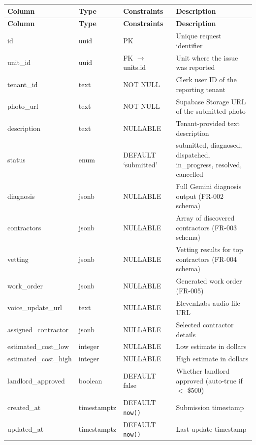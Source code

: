 \documentclass[12pt,a4paper]{article}
\begin{document}
\begin{longtable}{L{3cm} L{2cm} L{3cm} L{5cm}}
\toprule
\textbf{Column} & \textbf{Type} & \textbf{Constraints} & \textbf{Description} \\
\midrule
\endfirsthead
\toprule
\textbf{Column} & \textbf{Type} & \textbf{Constraints} & \textbf{Description} \\
\midrule
\endhead
\bottomrule
\endfoot
id & uuid & PK & Unique request identifier \\
\midrule
unit\_id & uuid & FK $\rightarrow$ units.id & Unit where the issue was reported \\
\midrule
tenant\_id & text & NOT NULL & Clerk user ID of the reporting tenant \\
\midrule
photo\_url & text & NOT NULL & Supabase Storage URL of the submitted photo \\
\midrule
description & text & NULLABLE & Tenant-provided text description \\
\midrule
status & enum & DEFAULT `submitted' & submitted, diagnosed, dispatched, in\_progress, resolved, cancelled \\
\midrule
diagnosis & jsonb & NULLABLE & Full Gemini diagnosis output (FR-002 schema) \\
\midrule
contractors & jsonb & NULLABLE & Array of discovered contractors (FR-003 schema) \\
\midrule
vetting & jsonb & NULLABLE & Vetting results for top contractors (FR-004 schema) \\
\midrule
work\_order & jsonb & NULLABLE & Generated work order (FR-005) \\
\midrule
voice\_update\_url & text & NULLABLE & ElevenLabs audio file URL \\
\midrule
assigned\_contractor & jsonb & NULLABLE & Selected contractor details \\
\midrule
estimated\_cost\_low & integer & NULLABLE & Low estimate in dollars \\
\midrule
estimated\_cost\_high & integer & NULLABLE & High estimate in dollars \\
\midrule
landlord\_approved & boolean & DEFAULT false & Whether landlord approved (auto-true if $<$ \$500) \\
\midrule
created\_at & timestamptz & DEFAULT \texttt{now()} & Submission timestamp \\
\midrule
updated\_at & timestamptz & DEFAULT \texttt{now()} & Last update timestamp \\
\end{longtable}
\end{document}
